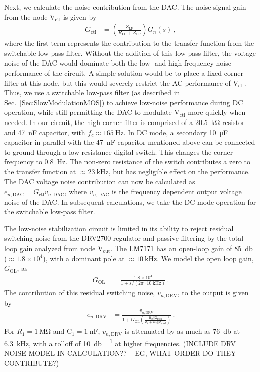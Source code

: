 \documentclass[aip,rsi,reprint]{revtex4-1} %
\begin{document}
Next, we calculate the noise contribution from the DAC.
The noise signal gain from the node $\text{V}_{\text{ctl}}$ is given by
\begin{align}
\label{Eq:Gdc}
G_{\text{ctl}} &= \left(\frac{Z_\text{LP}}{R_\text{LP} + Z_\text{LP}}\right)G_n(s)\,,
\end{align}
where the first term represents the contribution to the transfer function from the switchable low-pass filter.
Without the addition of this low-pass filter, the voltage noise of the DAC would dominate both the low- and high-frequency noise performance of the circuit.
A simple solution would be to place a fixed-corner filter at this node, but this would severely restrict the AC performance of $\text{V}_\text{ctl}$.
Thus, we use a switchable low-pass filter (as described in Sec.~\ref{Sec:SlowModulationMOS}) to achieve low-noise performance during DC operation, while still permitting the DAC to modulate $\text{V}_\text{ctl}$ more quickly when needed.
In our circuit, the high-corner filter is comprised of a \SI{20.5}{\kilo\ohm} resistor and \SI{47}{\nano\farad} capacitor, with $f_c \approx \SI{165}{\hertz}$.
In DC mode, a secondary \SI{10}{\micro\farad} capacitor in parallel with the \SI{47}{\nano\farad} capacitor mentioned above can be connected to ground through a low resistance digital switch.
This changes the corner frequency to \SI{0.8}{\hertz}.
The non-zero resistance of the switch contributes a zero to the transfer function at $\approx\SI{23}{\kilo\hertz}$, but has negligible effect on the performance.
The DAC voltage noise contribution can now be calculated as $e_{n,\text{DAC}} = G_{\text{ctl}} v_{n,\text{DAC}}$, where $v_{n,\text{DAC}}$ is the frequency dependent output voltage noise of the DAC. 
In subsequent calculations, we take the DC mode operation for the switchable low-pass filter.

The low-noise stabilization circuit is limited in its ability to reject residual switching noise from the DRV2700 regulator and passive filtering by the total loop gain analyzed from node $\text{V}_\text{out}$.
The LM7171 has an open-loop gain of \SI{85}{\decibel} ($\approx 1.8\times 10^4$), with a dominant pole at $\approx\SI{10}{\kilo\hertz}$\cite{LM7171Datasheet}.
We model the open loop gain, $G_\text{OL}$, as
\begin{align}
G_\text{OL} &= \frac{1.8\times10^4}{1+s/(2\pi\cdot\SI{10}{\kilo\hertz})}\,.
\end{align}
The contribution of this residual switching noise, $v_{n,\text{DRV}}$, to the output is given by
\begin{align}
e_{n,\text{DRV}} &= \frac{v_{n,\text{DRV}}}{1+G_\text{OL}\left(\frac{R_2||Z_\text{mod}}{Z_1 + R_2||Z_\text{mod}}\right)}\,.
\end{align}
For $R_1=\SI{1}{\mega\ohm}$ and $\text{C}_1 = \SI{1}{\nano\farad}$, $v_{n,\text{DRV}}$ is attenuated by as much as \SI{76}{\decibel} at \SI{6.3}{\kilo\hertz}, with a rolloff of \SI[per-mode=symbol]{10}{\decibel\per{}} at higher frequencies.
(INCLUDE DRV NOISE MODEL IN CALCULATION?? -- EG, WHAT ORDER DO THEY CONTRIBUTE?)
\end{document}
